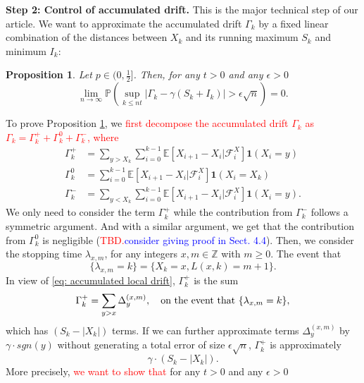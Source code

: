 \documentclass[twoside,12pt,a4paper]{article}
\newtheorem{proposition}{Proposition}[section]
\numberwithin{equation}{section}
\newcommand{\abs}[1]{\left\vert #1 \right\vert}
\newcommand\TBD{\textcolor{red}{TBD.}}
\newcommand{\edt}[1]{\textcolor{red}{#1}} %
\newcommand{\comment}[1]{\textcolor{blue}{#1}}
\begin{document}
	\textbf{Step 2: Control of accumulated drift.} This is the major technical step of our article. We want to approximate the accumulated drift $\Gamma_k$ by a fixed linear combination of the distances between $X_k$ and its running maximum $S_k$ and minimum $I_k$:
	\begin{proposition}\label{lm: control of acc drift}
		Let $p\in (0,\frac{1}{2}]$. Then, for any $t>0$ and any $\epsilon >0$
		\begin{equation}\label{eq: control of acc drift}
			\lim_{n \to \infty }\mathbb{P}\left(\sup_{k\leq nt} \abs{\Gamma_k - \gamma \left(S_k + I_k \right)   } > \epsilon \sqrt{n}  \right) =0. 
		\end{equation}
	\end{proposition}
	To prove Proposition \ref{lm: control of acc drift}, we \edt{first decompose the accumulated drift $\Gamma_k$ as $\Gamma_k = 	\Gamma_k^+ +	\Gamma_k^0 + \Gamma_k^-$, where} 
	\begin{align*}
		\Gamma_k^+ &= \sum_{y > X_k} \sum_{i = 0}^{k-1} \mathbb{E}\left[ X_{i + 1} - X_i | \mathcal{F}_i^X \right] \mathbf{1}(X_i = y)\\
		\Gamma_k^0 &= \sum_{i = 0}^{k-1} \mathbb{E}\left[ X_{i + 1} - X_i | \mathcal{F}_i^X \right] \mathbf{1}(X_i = X_k) \\
		\Gamma_k^- &= \sum_{y < X_k} \sum_{i = 0}^{k-1} \mathbb{E}\left[ X_{i + 1} - X_i | \mathcal{F}_i^X \right] \mathbf{1}(X_i = y)
		.\end{align*} 
		We only need to consider the term $\Gamma_k^+$ while the contribution from $\Gamma_k^-$ follows a symmetric argument. And with a similar argument, we get that the contribution from $\Gamma_k^0$ is negligible (\TBD \comment{consider giving proof in Sect. 4.4}).
	 Then,  we consider the stopping time $\lambda_{x,m}$, for any integers $x ,m  \in \mathbb{Z}$ with $m \geq 0$. The event that 
	 $$\{ \lambda_{x,m} =k \} = \{ X_k = x, L(x,k) =m +1  \}.  $$ 
	In view of \eqref{eq: accumulated local drift},  $\Gamma_k^+$ is the sum
	\begin{equation}
	\Gamma_k^+ = \sum_{y>x} \Delta_y^{(x,m)}, \mbox{\quad on the event that $\{ \lambda_{x,m}=k  \}$},
	\end{equation} 
	which has $(S_k - \abs{X_k})$ terms. If we can further approximate terms $\Delta_y^{(x,m)}$ by $\gamma\cdot sgn(y)$ without generating a total error of size $\epsilon \sqrt{n}$, $\Gamma_k^+$ is approximately 
	$$   
	\gamma \cdot (S_k - \abs{X_k}).
	$$
	More precisely, \edt{we want to show that} for any $t>0$ and any $\epsilon >0$
\end{document}
